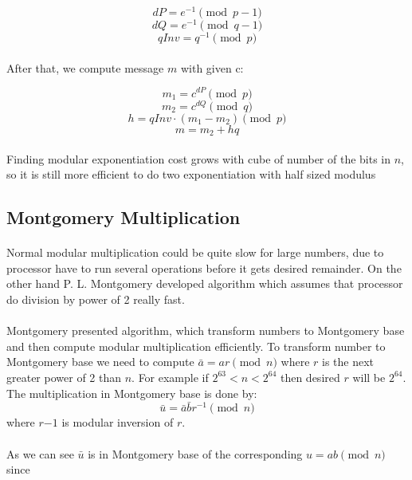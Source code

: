 \documentclass[thesis=B,english]{FITthesis}[2012/10/20]
\begin{document}
{\[dP = e^{-1} \pmod{p-1}\]
\[dQ = e^{-1} \pmod{q-1}\]
\[qInv = q^{-1} \pmod{p}\]

\paragraph*{}
{After that, we compute message \(m\) with given c:}

\[m_1 = c^{dP} \pmod{p}\]
\[m_2 = c^{dQ} \pmod{q}\]
\[h = qInv \cdot (m_1 - m_2) \pmod{p}\]  
\[m = m_2 + hq\]

\paragraph*{}
{Finding modular exponentiation cost grows with cube of number of the bits in \(n\), so it is still more efficient to do two exponentiation with half sized modulus}



\subsection{Montgomery Multiplication}

\paragraph*{}
{Normal modular multiplication could be quite slow for large numbers, due to processor have to run several operations before it gets desired remainder. 
On the other hand P. L. Montgomery developed algorithm which assumes that processor do division by power of 2 really fast.}
\paragraph*{}{
Montgomery presented algorithm, which transform numbers to Montgomery base and then compute modular multiplication efficiently.
To transform number to Montgomery base we need to compute \(\bar{a} = ar \pmod{n}\) where \(r\) is the next greater power of 2 than \(n\). For example if \(2^{63} < n < 2^{64}\) 
then desired \(r\) will be \(2^{64}\). The multiplication in Montgomery base is done by: \[\bar{u} = \bar{a}\bar{b}r^{-1} \pmod{n}\] where \(r{-1}\) is modular inversion of \(r\).
}
\paragraph*{}{
As we can see \(\bar{u}\) is in Montgomery base of the corresponding 
\(u = ab \pmod{n}\) 
since}

}
\end{document}
